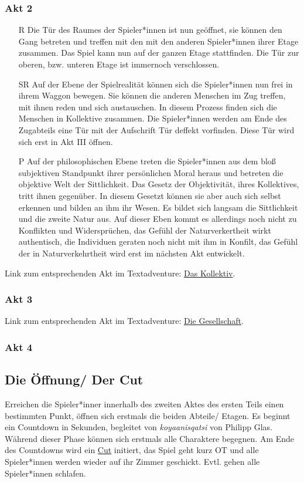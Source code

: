 \documentclass[a4paper, 12pt]{scrartcl}
\begin{document}
    \subsubsection{Akt 2}
    \begin{itemize}
    \item[R] Die Tür des Raumes der Spieler*innen ist nun geöffnet, sie können den Gang betreten und treffen mit den mit den anderen Spieler*innen ihrer Etage zusammen.
    Das Spiel kann nun auf der ganzen Etage stattfinden. 
    Die Tür zur oberen, bzw. unteren Etage ist immernoch verschlossen.
    \item[SR] Auf der Ebene der Spielrealität können sich die Spieler*innen nun frei in ihrem Waggon bewegen. 
    Sie können die anderen Menschen im Zug treffen, mit ihnen reden und sich austauschen. 
    In diesem Prozess finden sich die Menschen in Kollektive zusammen.
    Die Spieler*innen werden am Ende des Zugabteils eine Tür mit der Aufschrift \glqq Tür deffekt\grqq{} vorfinden.
    Diese Tür wird sich erst in Akt III öffnen.
    \item[P] Auf der philosophischen Ebene treten die Spieler*innen aus dem bloß subjektiven Standpunkt ihrer persönlichen Moral heraus und betreten die objektive Welt der Sittlichkeit.
    Das Gesetz der Objektivität, ihres Kollektives, tritt ihnen gegenüber.
    In diesem Gesetzt können sie aber auch sich selbst erkennen und bilden an ihm ihr Wesen. 
    Es bildet sich langsam die Sittlichkeit und die zweite Natur aus.
    Auf dieser Eben kommt es allerdings noch nicht zu Konflikten und Widersprüchen, das Gefühl der Naturverkertheit wirkt authentisch, die Individuen geraten noch nicht mit ihm in Konfilt, das Gefühl der in Naturverkehrtheit wird erst im nächsten Akt entwickelt.
    \end{itemize}
    Link zum entsprechenden Akt im Textadventure: \hyperref[das-kollektiv]{Das Kollektiv}.
    \subsubsection{Akt 3}
    Link zum entsprechenden Akt im Textadventure: \hyperref[die-gesellschaft]{Die Gesellschaft}.
    \subsubsection{Akt 4}
   
    \subsection{Die Öffnung/ Der Cut}
    Erreichen die Spieler*inner innerhalb des zweiten Aktes des ersten Teils einen bestimmten Punkt, öffnen sich erstmals die beiden Abteile/ Etagen. 
    Es beginnt ein Countdown in Sekunden, begleitet von \textit{koyaanisqatsi} von Philipp Glas. 
    Während dieser Phase können sich erstmals alle Charaktere begegnen. 
    Am Ende des Countdowns wird ein \hyperref[cut]{Cut} initiert, das Spiel geht kurz OT und alle Spieler*innen werden wieder auf ihr Zimmer geschickt. 
    Evtl. gehen alle Spieler*innen schlafen.  
\end{document}

